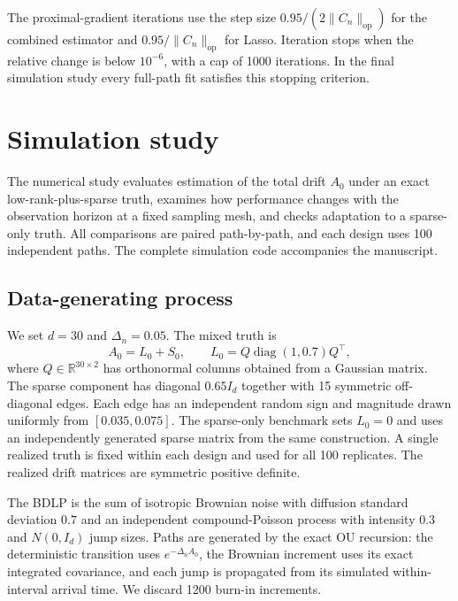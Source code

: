 \documentclass[12pt]{article}
\theoremstyle{definition}
\begin{document}
	The proximal-gradient iterations use the step size $0.95/(2\|C_n\|_{\mathrm{op}})$ for the combined estimator and $0.95/\|C_n\|_{\mathrm{op}}$ for Lasso. Iteration stops when the relative change is below $10^{-6}$, with a cap of 1000 iterations. In the final simulation study every full-path fit satisfies this stopping criterion.
	
	\section{Simulation study}
	\label{sec:simulation}
	
	The numerical study evaluates estimation of the total drift $A_0$ under an exact low-rank-plus-sparse truth, examines how performance changes with the observation horizon at a fixed sampling mesh, and checks adaptation to a sparse-only truth. All comparisons are paired path-by-path, and each design uses 100 independent paths. The complete simulation code accompanies the manuscript.
	
	\subsection{Data-generating process}
	
	We set $d=30$ and $\Delta_n=0.05$. The mixed truth is
	\begin{equation}
		A_0=L_0+S_0,
		\qquad
		L_0=Q\operatorname{diag}(1,0.7)Q^\top,
		\label{eq:sim_truth}
	\end{equation}
	where $Q\in\mathbb R^{30\times2}$ has orthonormal columns obtained from a Gaussian matrix. The sparse component has diagonal $0.65I_d$ together with 15 symmetric off-diagonal edges. Each edge has an independent random sign and magnitude drawn uniformly from $[0.035,0.075]$. The sparse-only benchmark sets $L_0=0$ and uses an independently generated sparse matrix from the same construction. A single realized truth is fixed within each design and used for all 100 replicates. The realized drift matrices are symmetric positive definite.
	
	The BDLP is the sum of isotropic Brownian noise with diffusion standard deviation $0.7$ and an independent compound-Poisson process with intensity $0.3$ and $N(0,I_d)$ jump sizes. Paths are generated by the exact OU recursion: the deterministic transition uses $e^{-\Delta_nA_0}$, the Brownian increment uses its exact integrated covariance, and each jump is propagated from its simulated within-interval arrival time. We discard 1200 burn-in increments.
	
\end{document}
